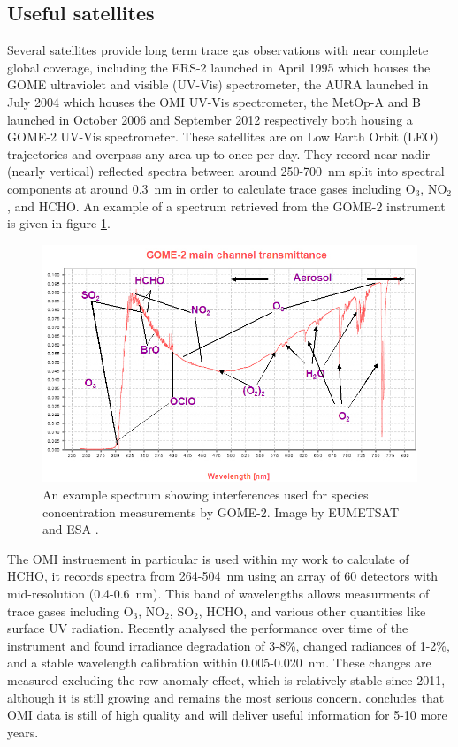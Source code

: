  \subsection{Useful satellites}
    Several satellites provide long term trace gas observations with near complete global coverage, including the ERS-2 launched in April 1995 which houses the GOME ultraviolet and visible (UV-Vis) spectrometer, the AURA launched in July 2004 which houses the OMI UV-Vis spectrometer, the MetOp-A and B launched in October 2006 and September 2012 respectively both housing a GOME-2 UV-Vis spectrometer.
    These satellites are on Low Earth Orbit (LEO) trajectories and overpass any area up to once per day. 
    They record near nadir (nearly vertical) reflected spectra between around 250-700~nm split into spectral components at around $0.3$~nm in order to calculate trace gases including O$_3$, NO$_2$, and HCHO.
    An example of a spectrum retrieved from the GOME-2 instrument is given in figure \ref{ch_LitRev:fig:gomeproducts}.

    \begin{figure}
      \includegraphics[width=\textwidth]{Figures/GOME_SPECTRUM.jpg}
      \caption{An example spectrum showing interferences used for species concentration measurements by GOME-2. Image by EUMETSAT and ESA \citep{GOME2Image}.}
      \label{ch_LitRev:fig:gomeproducts}
    \end{figure}

    The OMI instruement in particular is used within my work to calculate of HCHO, it records spectra from 264-504~nm using an array of 60 detectors with mid-resolution (0.4-0.6~nm).
    This band of wavelengths allows measurments of trace gases including O$_3$, NO$_2$, SO$_2$, HCHO, and various other quantities like surface UV radiation. 
    Recently \cite{Schenkeveld2017} analysed the performance over time of the instrument and found irradiance degradation of 3-8\%, changed radiances of 1-2\%, and a stable wavelength calibration within 0.005-0.020~nm.
    These changes are measured excluding the row anomaly effect, which is relatively stable since 2011, although it is still growing and remains the most serious concern.
    \cite{Schenkeveld2017} concludes that OMI data is still of high quality and will deliver useful information for 5-10 more years.
    
